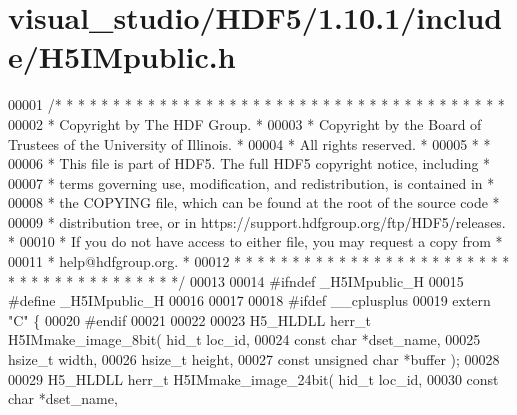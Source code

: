 \hypertarget{visual__studio_2_h_d_f5_21_810_81_2include_2_h5_i_mpublic_8h_source}{}\section{visual\+\_\+studio/\+H\+D\+F5/1.10.1/include/\+H5\+I\+Mpublic.h}
\label{visual__studio_2_h_d_f5_21_810_81_2include_2_h5_i_mpublic_8h_source}

\begin{DoxyCode}
00001 \textcolor{comment}{/* * * * * * * * * * * * * * * * * * * * * * * * * * * * * * * * * * * * * * *}
00002 \textcolor{comment}{ * Copyright by The HDF Group.                                               *}
00003 \textcolor{comment}{ * Copyright by the Board of Trustees of the University of Illinois.         *}
00004 \textcolor{comment}{ * All rights reserved.                                                      *}
00005 \textcolor{comment}{ *                                                                           *}
00006 \textcolor{comment}{ * This file is part of HDF5.  The full HDF5 copyright notice, including     *}
00007 \textcolor{comment}{ * terms governing use, modification, and redistribution, is contained in    *}
00008 \textcolor{comment}{ * the COPYING file, which can be found at the root of the source code       *}
00009 \textcolor{comment}{ * distribution tree, or in https://support.hdfgroup.org/ftp/HDF5/releases.  *}
00010 \textcolor{comment}{ * If you do not have access to either file, you may request a copy from     *}
00011 \textcolor{comment}{ * help@hdfgroup.org.                                                        *}
00012 \textcolor{comment}{ * * * * * * * * * * * * * * * * * * * * * * * * * * * * * * * * * * * * * * */}
00013 
00014 \textcolor{preprocessor}{#ifndef \_H5IMpublic\_H}
00015 \textcolor{preprocessor}{#define \_H5IMpublic\_H}
00016 
00017 
00018 \textcolor{preprocessor}{#ifdef \_\_cplusplus}
00019 \textcolor{keyword}{extern} \textcolor{stringliteral}{"C"} \{
00020 \textcolor{preprocessor}{#endif}
00021 
00022 
00023 H5\_HLDLL herr\_t  H5IMmake\_image\_8bit( hid\_t loc\_id,
00024                             \textcolor{keyword}{const} \textcolor{keywordtype}{char} *dset\_name,
00025                             hsize\_t width,
00026                             hsize\_t height,
00027                             \textcolor{keyword}{const} \textcolor{keywordtype}{unsigned} \textcolor{keywordtype}{char} *buffer );
00028 
00029 H5\_HLDLL herr\_t  H5IMmake\_image\_24bit( hid\_t loc\_id,
00030                              \textcolor{keyword}{const} \textcolor{keywordtype}{char} *dset\_name,

\end{DoxyCode}
